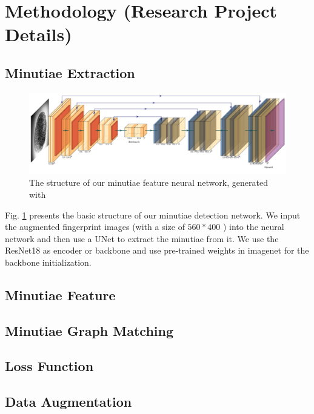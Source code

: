 \section{Methodology (Research Project Details)}


\subsection{Minutiae Extraction}


\begin{figure}[htbp]
    \centering
    \includegraphics[width=.9\linewidth]{fig/unet.pdf}
    \caption{The structure of our minutiae feature neural network, generated with \cite{PlotNeuralNet}}
    \label{fig:unet}
\end{figure}

Fig. \ref{fig:unet} presents the basic structure of our minutiae detection network.
We input the augmented fingerprint images (with a size of $ 560*400 $ ) into the neural network and then use a UNet to extract the minutiae from it.
We use the ResNet18 as encoder or backbone and use pre-trained weights in imagenet for the backbone initialization.


\subsection{Minutiae Feature}


\subsection{Minutiae Graph Matching}


\subsection{Loss Function}


\subsection{Data Augmentation}

